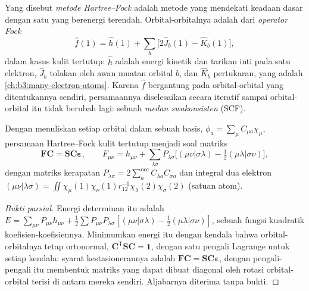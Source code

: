 \begin{definition}\label{def:b3:computational-chemistry:hartree-fock}
Yang disebut \emph{metode Hartree--Fock} adalah
metode yang mendekati keadaan dasar dengan satu  yang
berenergi terendah.
Orbital-orbitalnya adalah  dari \emph{operator
Fock}
\[
\hat f(1) = \hat h(1) + \sum_b\big[2\hat J_b(1) - \hat K_b(1)\big],
\]
dalam kasus kulit tertutup: $\hat h$ adalah energi kinetik dan tarikan inti
pada satu elektron, $\hat J_b$ tolakan oleh awan muatan orbital $b$, dan
$\hat K_b$  pertukaran, yang  adalah  \cref{ch:b3:many-electron-atoms}. Karena $\hat f$ bergantung pada
orbital-orbital yang ditentukannya sendiri, persamaannya diselesaikan secara
iteratif sampai orbital-orbital itu tidak berubah lagi: sebuah \emph{medan
swakonsisten} (SCF).
\end{definition}

\begin{theorem}\label{thm:b3:computational-chemistry:roothaan}
Dengan menuliskan setiap orbital dalam sebuah basis, $\phi_a = \sum_\mu C_{\mu a}\chi_\mu$,
persamaan Hartree--Fock kulit tertutup menjadi soal  matriks
\[
\mathbf F\mathbf C = \mathbf S\mathbf C\boldsymbol\varepsilon, \qquad F_{\mu\nu} =
h_{\mu\nu} + \sum_{\lambda\sigma}P_{\lambda\sigma}\big[(\mu\nu|\sigma\lambda) -
\tfrac12(\mu\lambda|\sigma\nu)\big],
\]
dengan matriks kerapatan $P_{\lambda\sigma} = 2\sum_a^{\mathrm{occ}}C_{\lambda a}C_{\sigma
a}$ dan integral dua elektron $(\mu\nu|\lambda\sigma) = \iint\chi_\mu(1)\chi_\nu(1)
r_{12}^{-1}\chi_\lambda(2)\chi_\sigma(2)$ (satuan atom).
\end{theorem}

\begin{proof}[Bukti parsial]
Energi determinan itu adalah $E = \sum_{\mu\nu}P_{\mu\nu}h_{\mu\nu} + \frac12
\sum P_{\mu\nu}P_{\lambda\sigma}[(\mu\nu|\sigma\lambda) - \frac12(\mu\lambda|\sigma\nu)]$,
sebuah fungsi kuadratik koefisien-koefisiennya. Minimumkan energi itu dengan
kendala bahwa orbital-orbitalnya tetap ortonormal,
$\mathbf C^{\mathsf T}\mathbf S\mathbf C = \mathbf 1$, dengan satu pengali
Lagrange untuk setiap kendala: syarat kestasionerannya adalah
$\mathbf F\mathbf C = \mathbf S\mathbf C\boldsymbol\varepsilon$, dengan
pengali-pengali itu membentuk matriks yang dapat dibuat diagonal oleh rotasi
orbital-orbital terisi di antara mereka sendiri. Aljabarnya diterima tanpa
bukti.
\end{proof}

